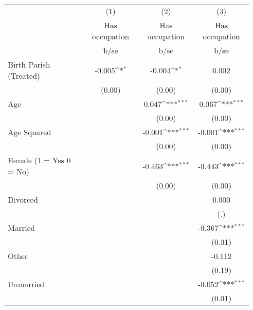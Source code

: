 {
\def\sym#1{\ifmmode^{#1}\else\(^{#1}\)\fi}
\begin{tabular}{l*{3}{c}}
\hline\hline
                    &\multicolumn{1}{c}{(1)}&\multicolumn{1}{c}{(2)}&\multicolumn{1}{c}{(3)}\\
                    &\multicolumn{1}{c}{Has occupation}&\multicolumn{1}{c}{Has occupation}&\multicolumn{1}{c}{Has occupation}\\
                    &        b/se         &        b/se         &        b/se         \\
\hline
Birth Parish (Treated)&      -0.005\sym{*}  &      -0.004\sym{*}  &       0.002         \\
                    &      (0.00)         &      (0.00)         &      (0.00)         \\
Age                 &                     &       0.047\sym{***}&       0.067\sym{***}\\
                    &                     &      (0.00)         &      (0.00)         \\
Age Squared         &                     &      -0.001\sym{***}&      -0.001\sym{***}\\
                    &                     &      (0.00)         &      (0.00)         \\
Female (1 = Yes 0 = No)&                     &      -0.463\sym{***}&      -0.443\sym{***}\\
                    &                     &      (0.00)         &      (0.00)         \\
Divorced            &                     &                     &       0.000         \\
                    &                     &                     &         (.)         \\
Married             &                     &                     &      -0.367\sym{***}\\
                    &                     &                     &      (0.01)         \\
Other               &                     &                     &      -0.112         \\
                    &                     &                     &      (0.19)         \\
Unmarried           &                     &                     &      -0.052\sym{***}\\
                    &                     &                     &      (0.01)         \\

\end{tabular}}
